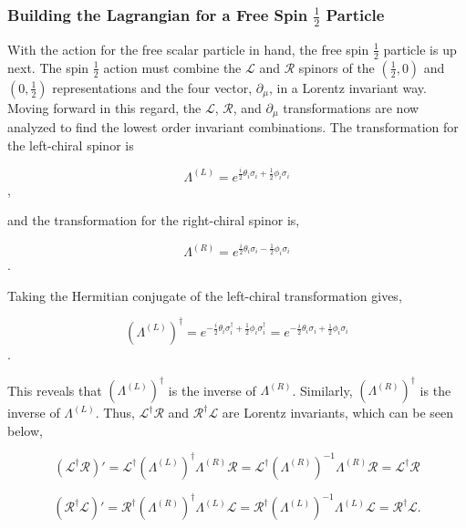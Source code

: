 \subsubsection{Building the Lagrangian for a Free Spin $\frac{1}{2}$ Particle}

With the action for the free scalar particle in hand, the free spin $\frac{1}{2}$ particle is up next. The spin $\frac{1}{2}$ action must combine the $\mathcal{L}$ and $\mathcal{R}$ spinors of the $(\frac{1}{2}, 0)$ and $(0, \frac{1}{2})$ representations and the four vector, $\partial_\mu$, in a Lorentz invariant way. Moving forward in this regard, the $\mathcal{L}$, $\mathcal{R}$, and $\partial_\mu$ transformations are now analyzed to find the lowest order invariant combinations. The transformation for the left-chiral spinor is 

\begin{equation}
\Lambda^{(L)} = e^{\frac{i}{2}\theta_i \sigma_i + \frac{1}{2}\phi_i \sigma_i}
\end{equation},

and the transformation for the right-chiral spinor is,

\begin{equation}
\Lambda^{(R)} = e^{\frac{i}{2}\theta_i \sigma_i - \frac{1}{2}\phi_i \sigma_i}
\end{equation}.

Taking the Hermitian conjugate of the left-chiral transformation gives,

\begin{equation}
(\Lambda^{(L)})^\dagger = e^{-\frac{i}{2}\theta_i \sigma_i^\dagger + \frac{1}{2}\phi_i \sigma_i^\dagger} 
= e^{-\frac{i}{2}\theta_i \sigma_i + \frac{1}{2}\phi_i \sigma_i}
\end{equation}.

This reveals that $(\Lambda^{(L)})^\dagger$ is the inverse of $\Lambda^{(R)}$. Similarly, $(\Lambda^{(R)})^\dagger$ is the inverse of $\Lambda^{(L)}$. Thus, $\mathcal{L}^\dagger\mathcal{R}$ and $\mathcal{R}^\dagger\mathcal{L}$ are Lorentz invariants, which can be seen below,

\begin{equation}
(\mathcal{L}^\dagger\mathcal{R})' = \mathcal{L}^\dagger (\Lambda^{(L)})^\dagger \Lambda^{(R)} \mathcal{R} 
= \mathcal{L}^\dagger (\Lambda^{(R)})^{-1} \Lambda^{(R)} \mathcal{R} = \mathcal{L}^\dagger \mathcal{R}  
\end{equation}

\begin{equation}
(\mathcal{R}^\dagger\mathcal{L})' = \mathcal{R}^\dagger (\Lambda^{(R)})^\dagger \Lambda^{(L)} \mathcal{L} 
= \mathcal{R}^\dagger (\Lambda^{(L)})^{-1} \Lambda^{(L)} \mathcal{L} = \mathcal{R}^\dagger \mathcal{L}. 
\end{equation}

